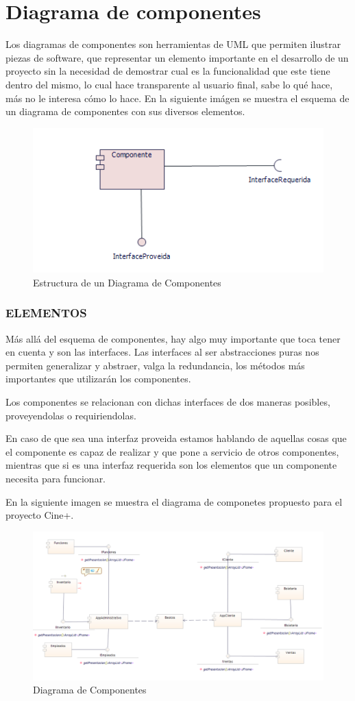 \chapter{Diagrama de componentes}	
	Los diagramas de componentes son herramientas de UML que permiten ilustrar piezas de software, que representar un elemento importante en el desarrollo de un proyecto sin la necesidad de demostrar cual es la funcionalidad que este tiene dentro del mismo, lo cual hace transparente al usuario final, sabe lo qué hace, más no le interesa cómo lo hace. En la siguiente imágen se muestra el esquema de un diagrama de componentes con sus diversos elementos.
	
\begin{figure}[h!]
	\centering
	\includegraphics[scale=0.8]{diseno/componentes/imgs/comp}
	\caption{Estructura de un Diagrama de Componentes}
\end{figure}

\subsection*{ELEMENTOS}
Más allá del esquema de componentes, hay algo muy importante que toca tener en cuenta y son las interfaces. Las interfaces al ser abstracciones puras nos permiten generalizar y abstraer, valga la redundancia, los métodos más importantes que utilizarán los componentes. 

Los componentes se relacionan con dichas interfaces de dos maneras posibles, proveyendolas o requiriendolas.

En caso de que sea una interfaz  proveida estamos hablando de aquellas cosas que el componente es capaz de realizar y que pone a servicio de otros componentes, mientras que si es una interfaz requerida son los elementos que un componente necesita para funcionar.

En la siguiente imagen se muestra el diagrama de componetes propuesto para el proyecto Cine+.

\begin{figure}[h!]
	\centering
	\includegraphics[scale=0.6]{diseno/componentes/imgs/diagramaComponentes}
	\caption{Diagrama de Componentes}

\end{figure}